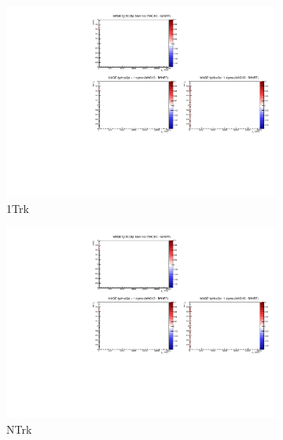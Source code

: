 \begin{figure}[h]
	\begin{subfigure}[t]{0.24\textwidth}
		\includegraphics[width=\textwidth, trim={5mm 70mm 100mm 7mm}, clip, page=4]{figures/mach3/banff/momentumProjections_170328_withMACH3_MAQEonly}
		\caption{1Trk}
	\end{subfigure}
	\begin{subfigure}[t]{0.24\textwidth}
		\includegraphics[width=\textwidth, trim={5mm 70mm 100mm 7mm}, clip, page=5]{figures/mach3/banff/momentumProjections_170328_withMACH3_MAQEonly}
		\caption{NTrk}
	\end{subfigure}
	\begin{subfigure}[t]{0.24\textwidth}

\end{subfigure}
\end{figure}
